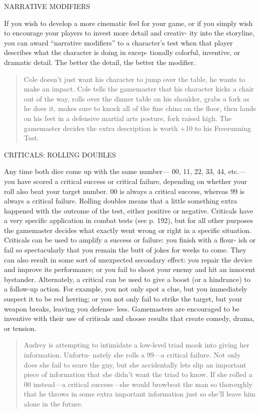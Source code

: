 NARRATIVE MODIFIERS

If you wish to develop a more cinematic feel for
your game, or if you simply wish to encourage
your players to invest more detail and creativ-
ity into the storyline, you can award “narrative
modifiers” to a character's test when that player
describes what the character is doing in excep-
tionally colorful, inventive, or dramatic detail.
The better the detail, the better the modifier.

\begin{quotation}
  Cole doesn't just want his character to jump over the table, he
  wants to make an impact. Cole tells the gamemaster that his
  character kicks a chair out of the way, rolls over the dinner table
  on his shoulder, grabs a fork as he does it, makes sure to knock all
  of the fine china on the floor, then lands on his feet in a
  defensive martial arts posture, fork raised high. The gamemaster
  decides the extra description is worth +10 to his Freerunning Test.
\end{quotation}

CRITICALS: ROLLING DOUBLES

Any time both dice come up with the same number—
00, 11, 22, 33, 44, etc.—you have scored a critical
success or critical failure, depending on whether your
roll also beat your target number. 00 is always a
critical success, whereas 99 is always a critical failure.
Rolling doubles means that a little something extra
happened with the outcome of the test, either positive
or negative. Criticals have a very specific application
in combat tests (see p. 192), but for all other purposes
the gamemaster decides what exactly went wrong or
right in a specific situation. Criticals can be used to
amplify a success or failure: you finish with a flour-
ish or fail so spectacularly that you remain the butt
of jokes for weeks to come. They can also result in
some sort of unexpected secondary effect: you repair
the device and improve its performance; or you fail
to shoot your enemy and hit an innocent bystander.
Alternately, a critical can be used to give a boost (or
a hindrance) to a follow-up action. For example, you
not only spot a clue, but you immediately suspect it
to be red herring; or you not only fail to strike the
target, but your weapon breaks, leaving you defense-
less. Gamemasters are encouraged to be inventive with
their use of criticals and choose results that create
comedy, drama, or tension.

\begin{quotation}
  Audrey is attempting to intimidate a low-level triad mook into
  giving her information. Unfortu- nately she rolls a 99—a critical
  failure. Not only does she fail to scare the guy, but she
  accidentally lets slip an important piece of information that she
  didn't want the triad to know. If she rolled a 00 instead—a critical
  success—she would browbeat the man so thoroughly that he throws in
  some extra important information just so she'll leave him alone in
  the future.
\end{quotation}


